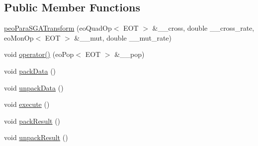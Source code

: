 \subsection*{Public Member Functions}
\begin{CompactItemize}
\item 
\hypertarget{classpeoParaSGATransform_2052bca82fbbfe5455bf6f69246d4dbf}{
\hyperlink{classpeoParaSGATransform_2052bca82fbbfe5455bf6f69246d4dbf}{peo\-Para\-SGATransform} (eo\-Quad\-Op$<$ EOT $>$ \&\_\-\_\-cross, double \_\-\_\-cross\_\-rate, eo\-Mon\-Op$<$ EOT $>$ \&\_\-\_\-mut, double \_\-\_\-mut\_\-rate)}
\label{classpeoParaSGATransform_2052bca82fbbfe5455bf6f69246d4dbf}

\item 
\hypertarget{classpeoParaSGATransform_669de7f7c6316fa745a15b909efb6527}{
void \hyperlink{classpeoParaSGATransform_669de7f7c6316fa745a15b909efb6527}{operator()} (eo\-Pop$<$ EOT $>$ \&\_\-\_\-pop)}
\label{classpeoParaSGATransform_669de7f7c6316fa745a15b909efb6527}

\item 
\hypertarget{classpeoParaSGATransform_fd278bcde58d29c9a343d5cbead81a1e}{
void \hyperlink{classpeoParaSGATransform_fd278bcde58d29c9a343d5cbead81a1e}{pack\-Data} ()}
\label{classpeoParaSGATransform_fd278bcde58d29c9a343d5cbead81a1e}

\item 
\hypertarget{classpeoParaSGATransform_a43a487a6e81791c8bbf6ce30f4336ab}{
void \hyperlink{classpeoParaSGATransform_a43a487a6e81791c8bbf6ce30f4336ab}{unpack\-Data} ()}
\label{classpeoParaSGATransform_a43a487a6e81791c8bbf6ce30f4336ab}

\item 
\hypertarget{classpeoParaSGATransform_c9de2100fb897177a401c634002f6dd9}{
void \hyperlink{classpeoParaSGATransform_c9de2100fb897177a401c634002f6dd9}{execute} ()}
\label{classpeoParaSGATransform_c9de2100fb897177a401c634002f6dd9}

\item 
\hypertarget{classpeoParaSGATransform_ba08e224ceaa4149e8e1a88694a2ccf2}{
void \hyperlink{classpeoParaSGATransform_ba08e224ceaa4149e8e1a88694a2ccf2}{pack\-Result} ()}
\label{classpeoParaSGATransform_ba08e224ceaa4149e8e1a88694a2ccf2}

\item 
\hypertarget{classpeoParaSGATransform_257663dcdc6cc95b6183d472ffba1b2f}{
void \hyperlink{classpeoParaSGATransform_257663dcdc6cc95b6183d472ffba1b2f}{unpack\-Result} ()}
\label{classpeoParaSGATransform_257663dcdc6cc95b6183d472ffba1b2f}


\end{CompactItemize}
